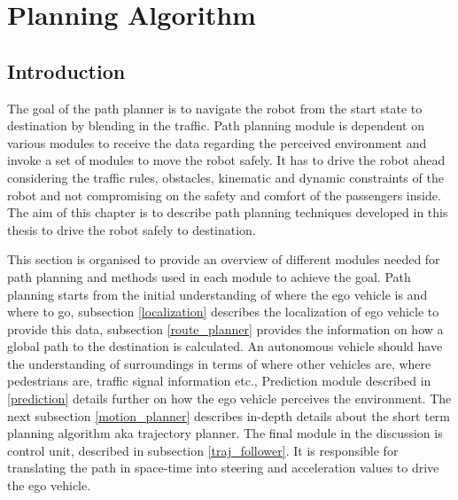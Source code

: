 \chapter{Planning Algorithm}
\section{Introduction}


The goal of the path planner is to navigate the robot from the start state to destination by blending in the traffic. Path planning module is dependent on various modules to receive the data regarding the perceived environment and invoke a set of modules to move the robot safely. It has to drive the robot ahead considering the traffic rules, obstacles, kinematic and dynamic constraints of the robot and not compromising on the safety and comfort of the passengers inside. The aim of this chapter is to describe path planning techniques developed in this thesis to drive the robot safely to destination.

This section is organised to provide an overview of different modules needed for path planning and methods used in each module to achieve the goal. Path planning starts from the initial understanding of where the ego vehicle is and where to go, subsection \ref{localization} describes the localization of ego vehicle to provide this data, subsection \ref{route_planner} provides the information on how a global path to the destination is calculated. An autonomous vehicle should have the understanding of surroundings in terms of where other vehicles are, where pedestrians are, traffic signal information etc., Prediction module described in \ref{prediction} details further on how the ego vehicle perceives the environment. The next subsection \ref{motion_planner} describes in-depth details about the short term planning algorithm aka trajectory planner. The final module in the discussion is control unit, described in subsection \ref{traj_follower}. It is responsible for translating the path in space-time into steering and acceleration values to drive the ego vehicle.

